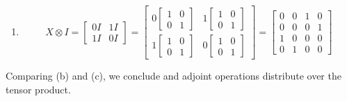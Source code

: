 \begin{example}
\begin{enumerate}
\[\begin{bmatrix}
        \end{bmatrix}=\begin{bmatrix} 0 & 1 & 0 & 0 \\ 1 & 0 & 0 & 0 \\ 0 & 0 & 0 & 1 \\ 0 & 0 & 1 & 0 \end{bmatrix}
        \]
        \item 
        \[
        X\otimes I=\begin{bmatrix}
            0I & 1I \\ 1I & 0I
        \end{bmatrix}= \begin{bmatrix}
            0\begin{bmatrix} 1 & 0 \\ 0 & 1 \end{bmatrix} & 1\begin{bmatrix} 1 & 0 \\ 0 & 1 \end{bmatrix} \\ 1\begin{bmatrix} 1 & 0 \\ 0 & 1 \end{bmatrix} & 0\begin{bmatrix} 1 & 0 \\ 0 & 1 \end{bmatrix}
        \end{bmatrix}=\begin{bmatrix} 0 & 0 & 1 & 0 \\ 0 & 0 & 0 & 1 \\ 1 & 0 & 0 & 0 \\ 0 & 1 & 0 & 0 \end{bmatrix}
        \]
    \end{enumerate}
    Comparing (b) and (c), we conclude and adjoint operations distribute over the tensor product.
\end{example}


